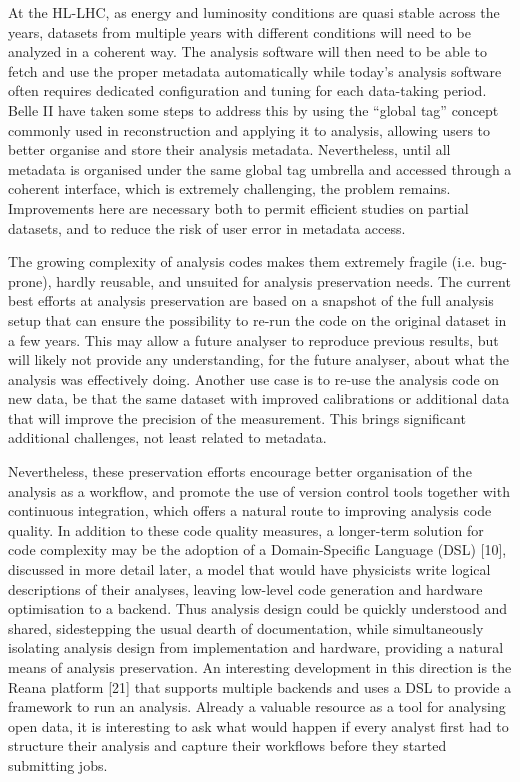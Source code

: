 \documentclass[10pt,a4paper]{article}
\begin{document}
At the HL-LHC, as energy and luminosity conditions are quasi stable
across the years, datasets from multiple years with different conditions
will need to be analyzed in a coherent way. The analysis software will
then need to be able to fetch and use the proper metadata automatically
while today's analysis software often requires dedicated configuration
and tuning for each data-taking period. Belle II have taken some steps
to address this by using the ``global tag'' concept commonly used in
reconstruction and applying it to analysis, allowing users to better
organise and store their analysis metadata. Nevertheless, until all
metadata is organised under the same global tag umbrella and accessed
through a coherent interface, which is extremely challenging, the
problem remains. Improvements here are necessary both to permit
efficient studies on partial datasets, and to reduce the risk of user
error in metadata access.

The growing complexity of analysis codes makes them extremely fragile
(i.e. bug-prone), hardly reusable, and unsuited for analysis
preservation needs. The current best efforts at analysis preservation
are based on a snapshot of the full analysis setup that can ensure the
possibility to re-run the code on the original dataset in a few years.
This may allow a future analyser to reproduce previous results, but will
likely not provide any understanding, for the future analyser, about
what the analysis was effectively doing. Another use case is to re-use
the analysis code on new data, be that the same dataset with improved
calibrations or additional data that will improve the precision of the
measurement. This brings significant additional challenges, not least
related to metadata.

Nevertheless, these preservation efforts encourage better organisation
of the analysis as a workflow, and promote the use of version control
tools together with continuous integration, which offers a natural route
to improving analysis code quality. In addition to these code quality
measures, a longer-term solution for code complexity may be the adoption
of a Domain-Specific Language (DSL) {[}10{]}, discussed in more detail
later, a model that would have physicists write logical descriptions of
their analyses, leaving low-level code generation and hardware
optimisation to a backend. Thus analysis design could be quickly
understood and shared, sidestepping the usual dearth of documentation,
while simultaneously isolating analysis design from implementation and
hardware, providing a natural means of analysis preservation. An
interesting development in this direction is the Reana platform {[}21{]}
that supports multiple backends and uses a DSL to provide a framework to
run an analysis. Already a valuable resource as a tool for analysing
open data, it is interesting to ask what would happen if every analyst
first had to structure their analysis and capture their workflows before
they started submitting jobs.
\end{document}
